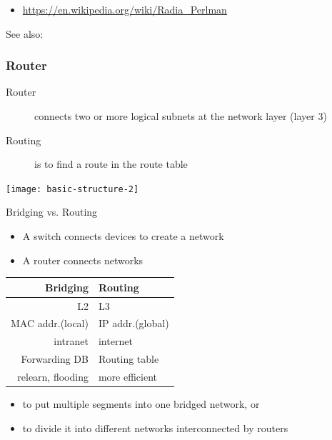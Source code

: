 \begin{itemize}
\item \url{https://en.wikipedia.org/wiki/Radia_Perlman}
\end{itemize}

See also: 

\subsubsection{Router}

\begin{frame}
  \begin{minipage}{.7\columnwidth}
    \begin{description}
    \item[Router] connects two or more logical subnets at the network layer (layer 3)
    \item[Routing] is to find a route in the route table
    \end{description}
  \end{minipage}\hfill
  \begin{minipage}{.29\columnwidth}
    \begin{center}
      \texttt{[image: basic-structure-2]}
    \end{center}
  \end{minipage}
\end{frame}

\begin{frame}
  \begin{block}{Bridging vs. Routing}
    \begin{itemize}
    \item A switch connects devices to create a network
    \item A router connects networks
    \end{itemize}
    \begin{center}
      \begin{tabular}{r|l}\toprule
        \textbf{Bridging}&\textbf{Routing}\\\midrule
        L2&L3\\
        MAC addr.(local)&IP addr.(global)\\
        intranet&internet\\
        Forwarding DB&Routing table\\
        relearn, flooding&more efficient\\\bottomrule
      \end{tabular}
    \end{center}
  \end{block}
  \begin{itemize}
  \item to put multiple segments into one bridged network, or
  \item to divide it into different networks interconnected by routers
  \end{itemize}
\end{frame}


